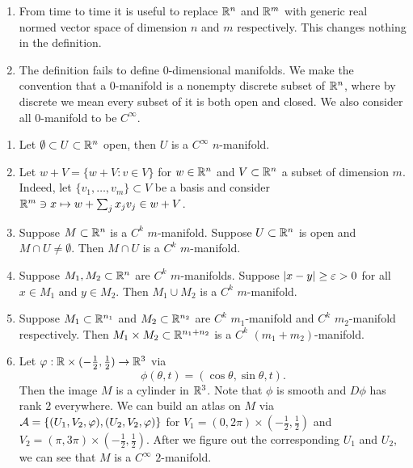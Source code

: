 \documentclass[a4paper]{article}
\begin{document}
\begin{remark}
  \begin{enumerate}
    \item From time to time it is useful to replace $\mathbb{R}^n$ and $\mathbb{R}^m$ with
          generic real normed vector space of dimension $n$ and $m$
          respectively. This changes nothing in the definition.

    \item The definition fails to define $0$-dimensional manifolds. We
          make the convention that a $0$-manifold is a nonempty discrete
          subset of $\mathbb{R}^n$, where by discrete we mean every subset of it
          is both open and closed. We also consider all $0$-manifold to be
          $C^\infty$.
  \end{enumerate}
\end{remark}

\begin{eg}
  \begin{enumerate}
    \item Let $\emptyset \subset U \subset \mathbb{R}^n$ open, then $U$ is a
          $C^\infty$ $n$-manifold.

    \item Let $w + V = \{w + V : v \in V\}$ for $w \in \mathbb{R}^n$ and $V
          \subset \mathbb{R}^n$ a subset of dimension $m$. Indeed, let $\{v_1,
          \dots, v_m\} \subset V$ be a basis and consider $\mathbb{R}^m \ni x
          \mapsto w + \sum_j x_j v_j \in w + V$.

    \item Suppose $M \subset \mathbb{R}^n$ is a $C^k$ $m$-manifold. Suppose $U
          \subset \mathbb{R}^n$ is open and $M \cap U \neq \emptyset$. Then $M
          \cap U$ is a $C^k$ $m$-manifold.

    \item Suppose $M_1, M_2 \subset \mathbb{R}^n$ are $C^k$ $m$-manifolds. Suppose
          $\left\lvert x - y\right\rvert \geq \varepsilon > 0$ for all $x \in M_1$ and $y \in
          M_2$. Then $M_1 \cup M_2$ is a $C^k$ $m$-manifold.

    \item Suppose $M_1 \subset \mathbb{R}^{n_1}$ and $M_2 \subset \mathbb{R}^{n_2}$ are
          $C^k$ $m_1$-manifold and $C^k$ $m_2$-manifold respectively. Then
          $M_1 \times M_2 \subset \mathbb{R}^{n_1 + n_2}$ is a $C^k$ $(m_1 +
          m_2)$-manifold.

    \item Let $\varphi: \mathbb{R} \times (-\frac{1}{2}, \frac{1}{2}) \to \mathbb{R}^3$ via
          \[
            \phi(\theta, t) = (\cos \theta, \sin \theta, t).
          \]
          Then the image $M$ is a cylinder in $\mathbb{R}^3$. Note that $\phi$ is
          smooth and $D \phi$ has rank $2$ everywhere. We can build an
          atlas on $M$ via $\mathcal{A} = \{(U_1, V_2, \varphi), (U_2, V_2,
          \varphi)\}$ for $V_1 = (0, 2\pi) \times (-\frac{1}{2},
          \frac{1}{2})$ and $V_2 = (\pi, 3\pi) \times (-\frac{1}{2},
          \frac{1}{2})$. After we figure out the corresponding $U_1$ and
          $U_2$, we can see that $M$ is a $C^\infty$ $2$-manifold.
  \end{enumerate}
\end{eg}
\end{document}
